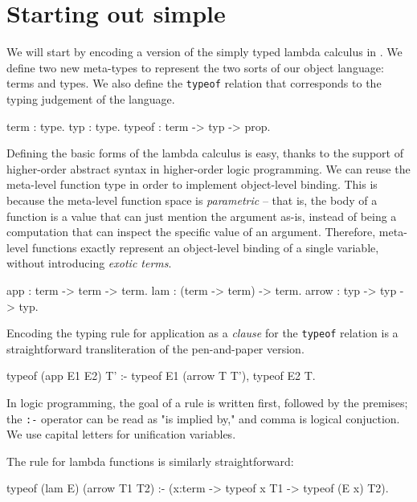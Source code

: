 \documentclass[format=acmlarge,review,anonymous]{acmart}\settopmatter{printfolios=true}
\begin{document}

\section{Starting out simple}

We will start by encoding a version of the simply typed lambda calculus in \lamprolog. We define two
new meta-types to represent the two sorts of our object language: terms and types. We also define
the \texttt{typeof} relation that corresponds to the typing judgement of the language.
\begin{codequote}
term   : type.
typ    : type.
typeof : term -> typ -> prop.
\end{codequote}

Defining the basic forms of the lambda calculus is easy, thanks to the support of higher-order
abstract syntax in higher-order logic programming. We can reuse the meta-level function type in
order to implement object-level binding. This is because the meta-level function space is
\textit{parametric} -- that is, the body of a function is a value that can just mention the argument
as-is, instead of being a computation that can inspect the specific value of an argument. Therefore,
meta-level functions exactly represent an object-level binding of a single variable, without
introducing \textit{exotic terms}.

\begin{codequote}
app    : term -> term -> term.
lam    : (term -> term) -> term.
arrow  : typ -> typ -> typ.
\end{codequote}

Encoding the typing rule for application as a \lamprolog \textit{clause} for the \texttt{typeof} relation is a
straightforward transliteration of the pen-and-paper version.

\begin{codequote}
typeof (app E1 E2) T' :-
  typeof E1 (arrow T T'),
  typeof E2 T.
\end{codequote}

In logic programming, the goal of a rule is written first, followed by the premises; the \texttt{:-}
operator can be read as "is implied by," and comma is logical conjuction. We use capital letters for
unification variables.

The rule for lambda functions is similarly straightforward: 

\begin{codequote}
typeof (lam E) (arrow T1 T2) :-
  (x:term -> typeof x T1 -> typeof (E x) T2).
\end{codequote}
\end{document}
